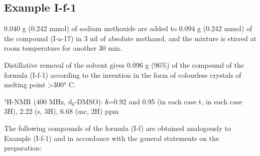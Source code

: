 \documentclass[11pt,a4paper]{article}
\begin{document}
\subsection{Example I-f-1}

0.040 g (0.242 mmol) of sodium methoxide are added to 0.094 g (0.242 mmol) of the compound (I-a-17) in 3 nil of absolute methanol, and the mixture is stirred at room temperature for another 30 min.

Distillative removal of the solvent gives 0.096 g (96\%) of the compound of the formula (I-f-1) according to the invention in the form of colourless crystals of melting point >300° C.

¹H-NMR (400 MHz, d₆-DMSO): δ=0.92 and 0.95 (in each case t, in each case 3H), 2.22 (s, 3H), 6.68 (mc, 2H) ppm

The following compounds of the formula (I-f) are obtained analogously to Example (I-f-1) and in accordance with the general statements on the preparation:
\end{document}
